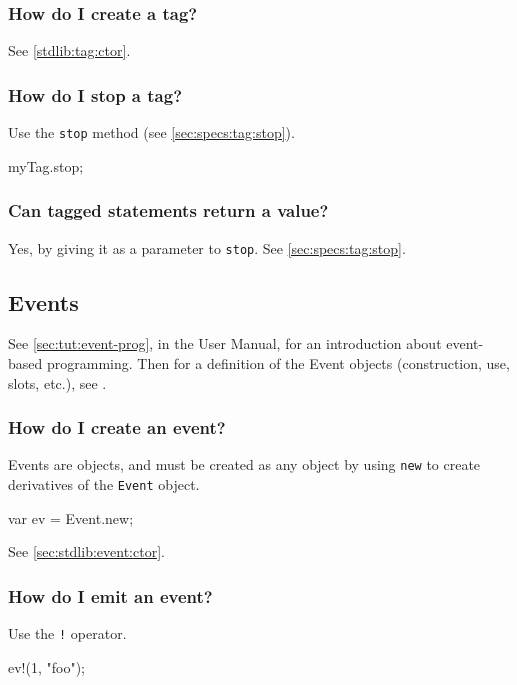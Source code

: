 \subsubsection{How do I create a tag?}
See \autoref{stdlib:tag:ctor}.

\subsubsection{How do I stop a tag?}
Use the \lstinline|stop| method (see \autoref{sec:specs:tag:stop}).
\begin{urbiunchecked}
myTag.stop;
\end{urbiunchecked}

\subsubsection{Can tagged statements return a value?}
Yes, by giving it as a parameter to \lstinline{stop}.  See
\autoref{sec:specs:tag:stop}.


\subsection{Events}

See \autoref{sec:tut:event-prog}, in the \us User Manual, for an
introduction about event-based programming.  Then for a definition of
the Event objects (construction, use, slots, etc.), see
.

\subsubsection{How do I create an event?}
Events are objects, and must be created as any object by using
\lstinline{new} to create derivatives of the \lstinline{Event} object.

\begin{urbiunchecked}
var ev = Event.new;
\end{urbiunchecked}

See \autoref{sec:stdlib:event:ctor}.

\subsubsection{How do I emit an event?}
Use the \lstinline|!| operator.

\begin{urbiunchecked}
ev!(1, "foo");
\end{urbiunchecked}


